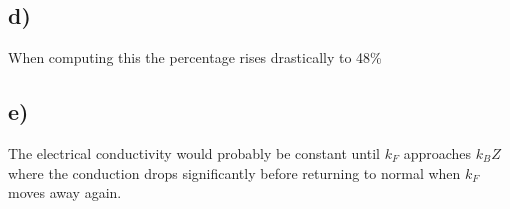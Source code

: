\documentclass{article}
\begin{document}
\subsection*{d)}
When computing this the percentage rises drastically to 48\%

\subsection*{e)}
The electrical conductivity would probably be constant until $k_F$ approaches $k_BZ$ where the conduction drops significantly before returning to normal when $k_F$ moves away again. 
\end{document}

